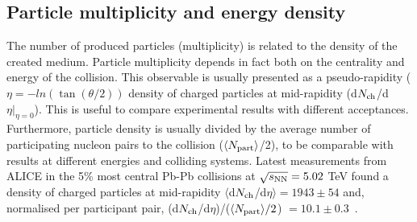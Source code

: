 \subsection{Particle multiplicity and energy density}
The number of produced particles (multiplicity) is related to the density of the created medium. Particle multiplicity depends in fact both on the centrality and energy of the collision. This observable is usually presented as a pseudo-rapidity ($\eta = - ln(\tan(\theta/2))$ density of charged particles at mid-rapidity (d$N_{\rm ch}$/d$\eta |_{\eta=0}$). This is useful to compare experimental results with different acceptances. Furthermore, particle density is usually divided by the average number of participating nucleon pairs to the collision ($\langle N_{\rm part}\rangle$/2), to be comparable with results at different energies and colliding systems. Latest measurements from ALICE in the 5\% most central Pb-Pb collisions at $\sqrt{s_{\rm NN}} = 5.02$ TeV found a density of charged particles at mid-rapidity $\langle $d$N_{\rm ch}$/d$\eta \rangle = 1943 \pm 54$ and, normalised per participant pair, (d$N_{\rm ch}$/d$\eta$)/($\langle N_{\rm part} \rangle/2$) $ = 10.1 \pm 0.3$~\cite{Adam:2015ptt}.  
